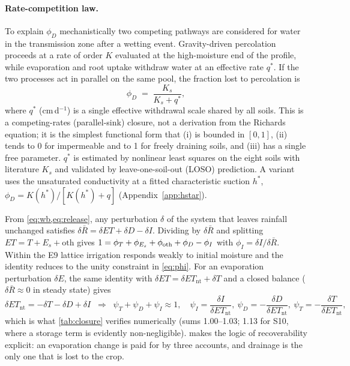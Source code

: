 \documentclass[preprint,12pt,authoryear]{elsarticle}
\newcommand{\Ent}{\mathit{ET}_{\mathrm{nt}}}
\begin{document}
\paragraph{Rate-competition law.}
\label{sec:ratelaw}
To explain $\phi_D$ mechanistically two competing pathways are considered for water in the transmission zone after a wetting event. Gravity-driven percolation proceeds at a rate of order $K$ evaluated at the high-moisture end of the profile, while evaporation and root uptake withdraw water at an effective rate $q^\ast$. If the two processes act in parallel on the same pool, the fraction lost to percolation is
\begin{equation}
\phi_D \;=\; \frac{K_s}{K_s+q^\ast},
\label{eq:rate}
\end{equation}
where $q^\ast$ (cm\,d$^{-1}$) is a single effective withdrawal scale shared by all soils. This is a competing-rates (parallel-sink) closure, not a derivation from the Richards equation; it is the simplest functional form that (i) is bounded in $[0,1]$, (ii) tends to 0 for impermeable and to 1 for freely draining soils, and (iii) has a single free parameter. $q^\ast$ is estimated by nonlinear least squares on the eight soils with literature $K_s$ and validated by leave-one-soil-out (LOSO) prediction. A variant uses the unsaturated conductivity at a fitted characteristic suction $h^\ast$,
$\phi_D=K(h^\ast)/[K(h^\ast)+q]$ (Appendix~\ref{app:hstar}).

\label{sec:theory}
From \cref{eq:wb,eq:release}, any perturbation $\delta$ of the system that leaves rainfall unchanged satisfies $\delta\bar R=\delta\mathit{ET}+\delta D-\delta I$. Dividing by $\delta\bar R$ and splitting $\mathit{ET}=T+E_s+\text{oth}$ gives $1=\phi_T+\phi_{E_s}+\phi_{\rm oth}+\phi_D-\phi_I$ with $\phi_I=\delta I/\delta\bar R$. Within the E9 lattice irrigation responds weakly to initial moisture and the identity reduces to the unity constraint in \cref{eq:phi}. For an evaporation perturbation $\delta E$, the same identity with $\delta\mathit{ET}=\delta\Ent+\delta T$ and a closed balance ($\delta\bar R\approx0$ in steady state) gives
\begin{equation}
\delta\Ent = -\delta T-\delta D+\delta I\;\;\Longrightarrow\;\;\psi_T+\psi_D+\psi_I\approx 1,\quad \psi_I=\frac{\delta I}{\delta\Ent},\ \psi_D=-\frac{\delta D}{\delta\Ent},\ \psi_T=-\frac{\delta T}{\delta\Ent},
\label{eq:psiclosure}
\end{equation}
which is what \cref{tab:closure} verifies numerically (sums 1.00--1.03; 1.13 for S10, where a storage term is evidently non-negligible).  makes the logic of recoverability explicit: an evaporation change is paid for by three accounts, and drainage is the only one that is lost to the crop.
\end{document}
